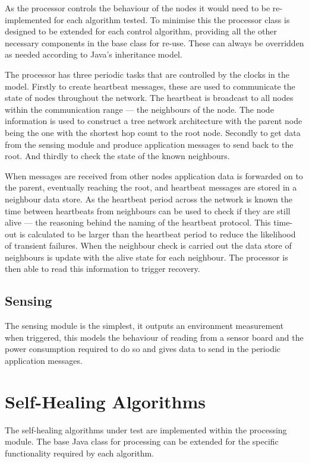 \documentclass[authoryearcitations]{UoYCSproject}
\begin{document}
As the processor controls the behaviour of the nodes it would need to be re-implemented for each algorithm tested. To minimise this the processor class is designed to be extended for each control algorithm, providing all the other necessary components in the base class for re-use. These can always be overridden as needed according to Java's inheritance model.

The processor has three periodic tasks that are controlled by the clocks in the model. Firstly to create heartbeat messages, these are used to communicate the state of nodes throughout the network. The heartbeat is broadcast to all nodes within the communication range --- the neighbours of the node. The node information is used to construct a tree network architecture with the parent node being the one with the shortest hop count to the root node. Secondly to get data from the sensing module and produce application messages to send back to the root. And thirdly to check the state of the known neighbours.

When messages are received from other nodes application data is forwarded on to the parent, eventually reaching the root, and heartbeat messages are stored in a neighbour data store. As the heartbeat period across the network is known the time between heartbeats from neighbours can be used to check if they are still alive --- the reasoning behind the naming of the heartbeat protocol. This time-out is calculated to be larger than the heartbeat period to reduce the likelihood of transient failures. When the neighbour check is carried out the data store of neighbours is update with the alive state for each neighbour. The processor is then able to read this information to trigger recovery.

\subsection{Sensing}

The sensing module is the simplest, it outputs an environment measurement when triggered, this models the behaviour of reading from a sensor board and the power consumption required to do so and gives data to send in the periodic application messages.

\section{Self-Healing Algorithms}

The self-healing algorithms under test are implemented within the processing module. The base Java class for processing can be extended for the specific functionality required by each algorithm.
\end{document}

